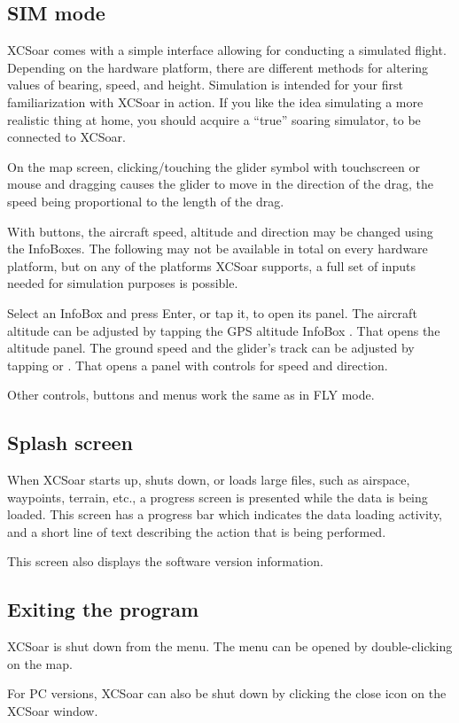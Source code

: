 \subsection*{SIM mode}
XCSoar comes with a simple interface allowing for conducting a simulated 
flight. Depending on the hardware platform, there are different 
methods for altering values of bearing, speed, and height.  Simulation is
intended for your first familiarization with XCSoar in action. If you like the 
idea simulating a more realistic thing at home, you should acquire a ``true''
soaring simulator, to be connected to XCSoar.

On the map screen, clicking/touching the glider symbol
with touchscreen or mouse and dragging 
causes the glider to move in the direction of the drag, the
speed being proportional to the length of the drag.

With buttons, the aircraft
speed, altitude and direction may be changed using the InfoBoxes.
The following may not be available in total on every hardware platform, but on 
any of the platforms XCSoar supports, a full set of inputs needed for 
simulation purposes is possible.

Select an InfoBox and press Enter, or tap it, to open its panel.
The aircraft altitude can be adjusted by tapping the GPS altitude
InfoBox .  That opens the altitude panel.
The ground speed and the glider's track can be adjusted by tapping
 or .  That opens a panel with controls
for speed and direction.

Other controls, buttons and menus work the same as in FLY mode.


\subsection*{Splash screen}
When XCSoar starts up, shuts down, or loads large files, such as airspace,
waypoints, terrain, etc., a progress screen is presented while the data is being
loaded. This screen has a progress bar which indicates the data loading
activity, and a short line of text describing the action that is being performed.

This screen also displays the software version information.

\subsection*{Exiting the program}
XCSoar is shut down from the menu. The menu can be
opened by double-clicking on the map.
\begin{quote}
\end{quote}

For PC versions, XCSoar can also be shut down by clicking the close icon
on the XCSoar window.
